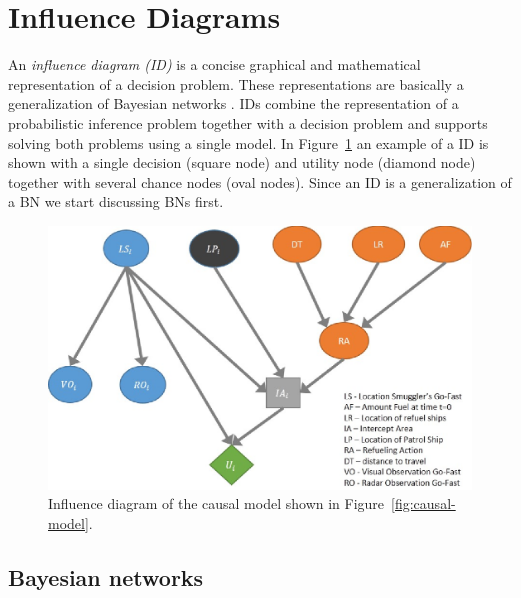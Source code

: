 \documentclass[conference]{IEEEtran}
\begin{document}
\section{Influence Diagrams}\label{sec:influence-diagrams}

An {\em influence diagram (ID)} \cite{howard84rpada,jensen07book} is a concise graphical and mathematical representation of a decision problem. These representations are basically a generalization of Bayesian networks \cite{pearl88book, jensen07book}. IDs combine the representation of a probabilistic inference problem together with a decision problem and supports solving both problems using a single model. In Figure~\ref{fig:decision-graph} an example of a ID is shown with a single decision (square node) and utility node (diamond node) together with several chance nodes (oval nodes). Since an ID is a generalization of a BN we start discussing BNs first.

 
\begin{figure}
\begin{center}
 \includegraphics[width=.4\textwidth]{decision-graph.eps}
 \caption{Influence diagram of the causal model shown in Figure~\ref{fig:causal-model}.\label{fig:decision-graph}}
\end{center}
\end{figure}


\subsection{Bayesian networks}\label{sec:bayesian-networks}
\end{document}
